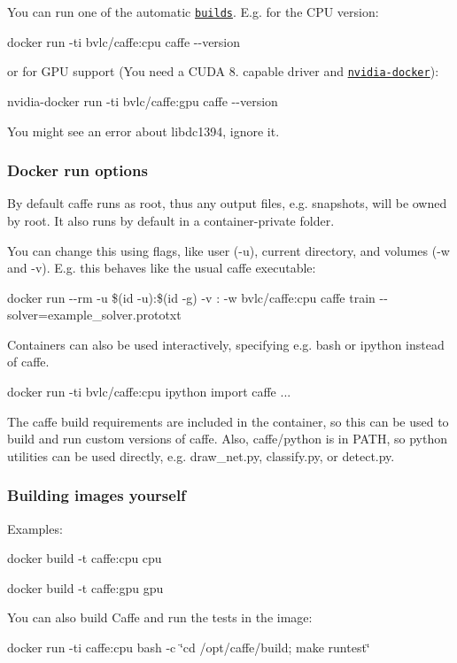You can run one of the automatic \href{https://hub.docker.com/r/bvlc/caffe}{\tt builds}. E.\+g. for the C\+PU version\+:

{\ttfamily docker run -\/ti bvlc/caffe\+:cpu caffe -\/-\/version}

or for G\+PU support (You need a C\+U\+DA 8. capable driver and \href{https://github.com/NVIDIA/nvidia-docker}{\tt nvidia-\/docker})\+:

{\ttfamily nvidia-\/docker run -\/ti bvlc/caffe\+:gpu caffe -\/-\/version}

You might see an error about libdc1394, ignore it.

\subsubsection*{Docker run options}

By default caffe runs as root, thus any output files, e.\+g. snapshots, will be owned by root. It also runs by default in a container-\/private folder.

You can change this using flags, like user (-\/u), current directory, and volumes (-\/w and -\/v). E.\+g. this behaves like the usual caffe executable\+:

{\ttfamily docker run -\/-\/rm -\/u \$(id -\/u)\+:\$(id -\/g) -\/v \+: -\/w  bvlc/caffe\+:cpu caffe train -\/-\/solver=example\+\_\+solver.\+prototxt}

Containers can also be used interactively, specifying e.\+g. {\ttfamily bash} or {\ttfamily ipython} instead of {\ttfamily caffe}.


\begin{DoxyCode}
docker run -ti bvlc/caffe:cpu ipython
import caffe
...
\end{DoxyCode}


The caffe build requirements are included in the container, so this can be used to build and run custom versions of caffe. Also, {\ttfamily caffe/python} is in P\+A\+TH, so python utilities can be used directly, e.\+g. {\ttfamily draw\+\_\+net.\+py}, {\ttfamily classify.\+py}, or {\ttfamily detect.\+py}.

\subsubsection*{Building images yourself}

Examples\+:

{\ttfamily docker build -\/t caffe\+:cpu cpu}

{\ttfamily docker build -\/t caffe\+:gpu gpu}

You can also build Caffe and run the tests in the image\+:

{\ttfamily docker run -\/ti caffe\+:cpu bash -\/c \char`\"{}cd /opt/caffe/build; make runtest\char`\"{}} 